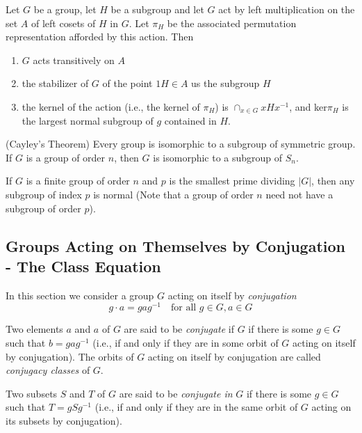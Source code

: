 \documentclass[../main]{subfiles}
\begin{document}
 
 \begin{thm}
  Let $G$ be a group, let $H$ be a subgroup and let $G$ act by left multiplication on the set $A$ of left cosets of $H$ in $G$. Let $\pi_H$ be the associated permutation representation afforded by this action. Then 
  \begin{enumerate}
   \item $G$ acts transitively on $A$
   \item the stabilizer of $G$ of the point $1H\in A$ us the subgroup $H$
   \item the kernel of the action (i.e., the kernel of $\pi_H$) is $\cap_{x\in G} xHx^{-1}$, and ker$\pi_H$ is the largest normal subgroup of $g$ contained in $H$.
  \end{enumerate}
 \end{thm}
 
 
 \begin{cor}
  (Cayley's Theorem) Every group is isomorphic to a subgroup of symmetric group. If $G$ is a group of order $n$, then $G$ is isomorphic to a subgroup of $S_n$.
 \end{cor}
 
 
 \begin{cor}
  If $G$ is a finite group of order $n$ and $p$ is the smallest prime dividing $|G|$, then any subgroup of index $p$ is normal (Note that a group of order $n$ need not have a subgroup of order $p$).
 \end{cor}
 
 
 \subsection{Groups Acting on Themselves by Conjugation - The Class Equation}
 
 
 \begin{nt}
  In this section we consider a group $G$ acting on itself by \textit{conjugation}
  \[g\cdot a = gag^{-1} \quad \text{for all } g\in G, a\in G\]
 \end{nt}
 
 
 \begin{dfn}
  Two elements $a$ and $a$ of $G$ are said to be \textit{conjugate} if $G$ if there is some $g\in G$ such that $b = gag^{-1}$ (i.e., if and only if they are in some orbit of $G$ acting on itself by conjugation). The orbits of $G$ acting on itself by conjugation are called \textit{conjugacy classes} of $G$.
 \end{dfn}
 
 
 \begin{dfn}
  Two subsets $S$ and $T$ of $G$ are said to be \textit{conjugate in} $G$ if there is some $g \in G$ such that $T = gSg^{-1}$ (i.e., if and only if they are in the same orbit of $G$ acting on its subsets by conjugation). 
 \end{dfn}
 
\end{document}
